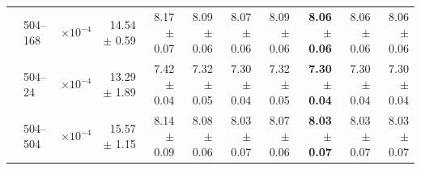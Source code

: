 \begin{table}[htbp]
\begin{tabular}{llcrrrrrrr|r}
 & 504--168 & $\times 10^{-4}$ & 14.54 $\pm$ 0.59 & 8.17 $\pm$ 0.07 & 8.09 $\pm$ 0.06 & 8.07 $\pm$ 0.06 & 8.09 $\pm$ 0.06 & \textbf{8.06 $\pm$ 0.06} & 8.06 $\pm$ 0.06 & 8.06 $\pm$ 0.06 \\
 & 504--24 & $\times 10^{-4}$ & 13.29 $\pm$ 1.89 & 7.42 $\pm$ 0.04 & 7.32 $\pm$ 0.05 & 7.30 $\pm$ 0.04 & 7.32 $\pm$ 0.05 & \textbf{7.30 $\pm$ 0.04} & 7.30 $\pm$ 0.04 & 7.30 $\pm$ 0.04 \\
 & 504--504 & $\times 10^{-4}$ & 15.57 $\pm$ 1.15 & 8.14 $\pm$ 0.09 & 8.08 $\pm$ 0.06 & 8.03 $\pm$ 0.07 & 8.07 $\pm$ 0.06 & \textbf{8.03 $\pm$ 0.07} & 8.03 $\pm$ 0.07 & 8.03 $\pm$ 0.07 \\
\bottomrule
\end{tabular}
\end{table}
